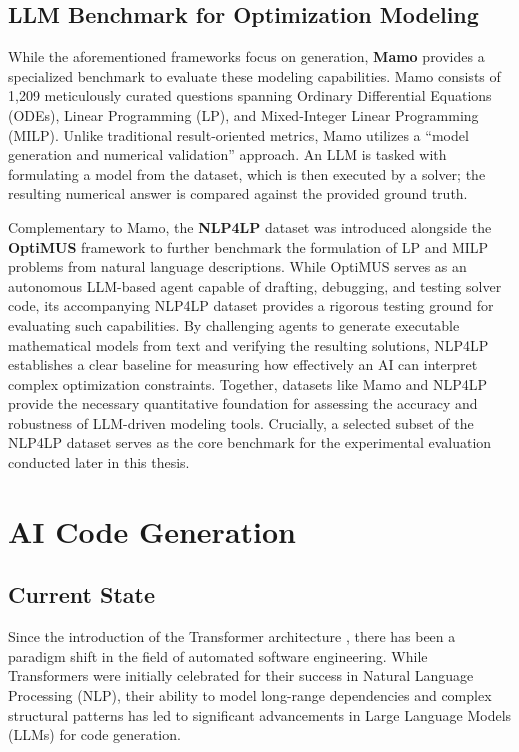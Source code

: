 \subsection{LLM Benchmark for Optimization Modeling}
While the aforementioned frameworks focus on generation, \textbf{Mamo} \cite{huang2025llmsmathematicalmodelingbridging} provides a specialized benchmark to evaluate these modeling capabilities. Mamo consists of 1,209 meticulously curated questions spanning Ordinary Differential Equations (ODEs), Linear Programming (LP), and Mixed-Integer Linear Programming (MILP). Unlike traditional result-oriented metrics, Mamo utilizes a ``model generation and numerical validation'' approach. An LLM is tasked with formulating a model from the dataset, which is then executed by a solver; the resulting numerical answer is compared against the provided ground truth. 

Complementary to Mamo, the \textbf{NLP4LP} dataset \cite{ahmaditeshnizi2023optimusoptimizationmodelingusing} was introduced alongside the \textbf{OptiMUS} framework to further benchmark the formulation of LP and MILP problems from natural language descriptions. While OptiMUS serves as an autonomous LLM-based agent capable of drafting, debugging, and testing solver code, its accompanying NLP4LP dataset provides a rigorous testing ground for evaluating such capabilities. By challenging agents to generate executable mathematical models from text and verifying the resulting solutions, NLP4LP establishes a clear baseline for measuring how effectively an AI can interpret complex optimization constraints. Together, datasets like Mamo and NLP4LP provide the necessary quantitative foundation for assessing the accuracy and robustness of LLM-driven modeling tools. Crucially, a selected subset of the NLP4LP dataset serves as the core benchmark for the experimental evaluation conducted later in this thesis.


\section{AI Code Generation}

\subsection{Current State}
Since the introduction of the Transformer architecture \cite{vaswani2023attentionneed}, there has been a paradigm shift in the field of automated software engineering. While Transformers were initially celebrated for their success in Natural Language Processing (NLP), their ability to model long-range dependencies and complex structural patterns has led to significant advancements in Large Language Models (LLMs) for code generation.

